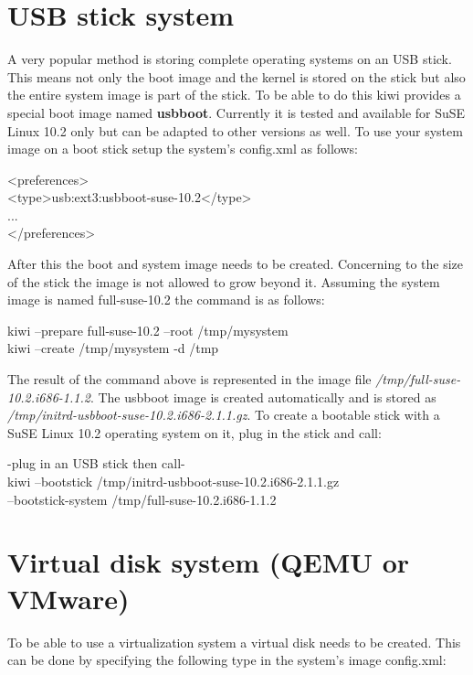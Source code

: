 \section{USB stick system}
A very popular method is storing complete operating systems on an USB
stick. This means not only the boot image and the kernel is stored on
the stick but also the entire system image is part of the stick.
To be able to do this kiwi provides a special boot image named
\textbf{usbboot}. Currently it is tested and available
for SuSE Linux 10.2 only but can be adapted to other versions as well.
To use your system image on a boot stick setup the system's config.xml
as follows:

\begin{Command}{14cm}
<preferences>\\
\hspace*{1cm}<type>usb:ext3:usbboot-suse-10.2</type>\\
\hspace*{1cm}...\\
</preferences>
\end{Command}

After this the boot and system image needs to be
created. Concerning to the size of the stick the image is not allowed to
grow beyond it. Assuming the system image is named full-suse-10.2
the command is as follows:

\begin{Command}{14cm}
	kiwi --prepare full-suse-10.2 --root /tmp/mysystem\\
	kiwi --create /tmp/mysystem -d /tmp
\end{Command}

The result of the command above is represented in the image file
\textit{/tmp/full-suse-10.2.i686-1.1.2}. The usbboot image is created
automatically and is stored as
\textit{/tmp/initrd-usbboot-suse-10.2.i686-2.1.1.gz}.
To create a bootable stick with a SuSE Linux 10.2 operating system on
it, plug in the stick and call:

\begin{Command}{14cm}
	-plug in an USB stick then call-\\
	kiwi --bootstick /tmp/initrd-usbboot-suse-10.2.i686-2.1.1.gz \bs\\
    \hspace*{1.1cm}--bootstick-system /tmp/full-suse-10.2.i686-1.1.2
\end{Command}

\section{Virtual disk system (QEMU or VMware)}
To be able to use a virtualization system a virtual disk needs to
be created. This can be done by specifying the following type in the
system's image config.xml:

